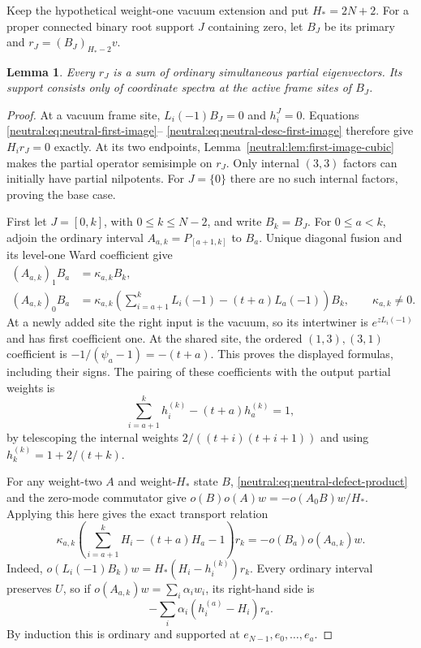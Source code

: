 \documentclass[11pt,a4paper]{article}
\numberwithin{equation}{section}
\newtheorem{lemma}[theorem]{Lemma}
\theoremstyle{definition}\newtheorem{definition}[theorem]{Definition}
\theoremstyle{remark}\newtheorem{remark}[theorem]{Remark}
\begin{document}
Keep the hypothetical weight-one vacuum extension and put $H_*=2N+2$.
For a proper connected binary root support $J$ containing zero, let
$B_J$ be its primary and $r_J=(B_J)_{H_*-2}v$.

\begin{lemma}\label{neutral:lem:proper-first-images}
Every $r_J$ is a sum of ordinary simultaneous partial eigenvectors.
Its support consists only of coordinate spectra at the active frame
sites of $B_J$.
\end{lemma}

\begin{proof}
At a vacuum frame site, $L_i(-1)B_J=0$ and $h_i^{J}=0$.
Equations \eqref{neutral:eq:neutral-first-image}--
\eqref{neutral:eq:neutral-desc-first-image} therefore give
$H_ir_J=0$ exactly.  At its two endpoints,
Lemma~\ref{neutral:lem:first-image-cubic} makes the partial operator
semisimple on $r_J$.  Only internal $(3,3)$ factors can initially
have partial nilpotents.  For $J=\{0\}$ there are no such internal
factors, proving the base case.

First let $J=[0,k]$, with $0\leq k\leq N-2$, and write $B_k=B_J$.
For $0\leq a<k$, adjoin the ordinary interval $A_{a,k}=P_{[a+1,k]}$
to $B_a$.  Unique diagonal fusion and its level-one Ward coefficient
give
\begin{align*}
 (A_{a,k})_1B_a&=\kappa_{a,k}B_k,\\
 (A_{a,k})_0B_a&=\kappa_{a,k}
 \left(\sum_{i=a+1}^{k}L_i(-1)-(t+a)L_a(-1)\right)B_k,
                         \qquad\kappa_{a,k}\ne0.
\end{align*}
At a newly added site the right input is the vacuum, so its
intertwiner is $e^{zL_i(-1)}$ and has first coefficient one.  At the
shared site, the ordered $(1,3),(3,1)$ coefficient is
$-1/(\psi_a-1)=-(t+a)$.  This proves the displayed formulas, including
their signs.  The pairing of these coefficients with the output
partial weights is
\[
 \sum_{i=a+1}^{k}h_i^{(k)}-(t+a)h_a^{(k)}=1,
\]
by telescoping the internal weights
$2/((t+i)(t+i+1))$ and using $h_k^{(k)}=1+2/(t+k)$.

For any weight-two $A$ and weight-$H_*$ state $B$,
\eqref{neutral:eq:neutral-defect-product} and the zero-mode commutator
give $o(B)o(A)w=-o(A_0B)w/H_*$.  Applying this here gives the exact
transport relation
\begin{equation}\label{neutral:eq:proper-prefix-transport}
 \kappa_{a,k}\left(\sum_{i=a+1}^{k}H_i-(t+a)H_a-1\right)r_k
                       =-o(B_a)o(A_{a,k})w.
\end{equation}
Indeed, $o(L_i(-1)B_k)w=H_*(H_i-h_i^{(k)})r_k$.
Every ordinary interval preserves $U$, so if
$o(A_{a,k})w=\sum_i\alpha_iw_i$, its right-hand side is
\[
                    -\sum_i\alpha_i(h_i^{(a)}-H_i)r_a.
\]
By induction this is ordinary and supported at
$e_{N-1},e_0,\ldots,e_a$.


\end{proof}
\end{document}
